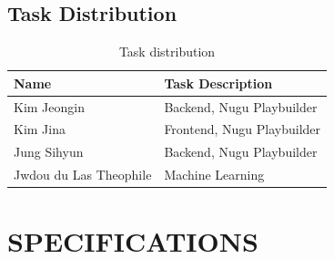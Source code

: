 \documentclass[conference]{IEEEtran}
\begin{document}
\subsection{Task Distribution}
\begin{table}[h]
\centering
\caption{Task distribution}
\begin{tabular}[t]{ll}
\toprule
Name&Task Description\\
\midrule
Kim Jeongin&Backend, Nugu Playbuilder\\
Kim Jina&Frontend, Nugu Playbuilder\\
Jung Sihyun&Backend, Nugu Playbuilder\\
Jwdou du Las Theophile&Machine Learning\\
\bottomrule
\end{tabular}
\end{table}%

\section{SPECIFICATIONS}
\end{document}
